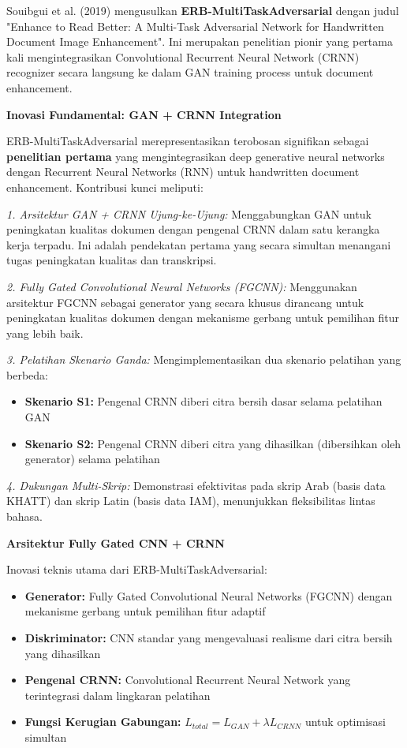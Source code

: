 \documentclass[12pt,a4paper]{article}
\begin{document}
Souibgui et al. (2019) \cite{erb2019} mengusulkan \textbf{ERB-MultiTaskAdversarial} dengan judul "Enhance to Read Better: A Multi-Task Adversarial Network for Handwritten Document Image Enhancement". Ini merupakan penelitian pionir yang pertama kali mengintegrasikan Convolutional Recurrent Neural Network (CRNN) recognizer secara langsung ke dalam GAN training process untuk document enhancement.

\textbf{Inovasi Fundamental: GAN + CRNN Integration}

ERB-MultiTaskAdversarial merepresentasikan terobosan signifikan sebagai \textbf{penelitian pertama} yang mengintegrasikan deep generative neural networks dengan Recurrent Neural Networks (RNN) untuk handwritten document enhancement. Kontribusi kunci meliputi:

\textit{1. Arsitektur GAN + CRNN Ujung-ke-Ujung:} Menggabungkan GAN untuk peningkatan kualitas dokumen dengan pengenal CRNN dalam satu kerangka kerja terpadu. Ini adalah pendekatan pertama yang secara simultan menangani tugas peningkatan kualitas dan transkripsi.

\textit{2. Fully Gated Convolutional Neural Networks (FGCNN):} Menggunakan arsitektur FGCNN sebagai generator yang secara khusus dirancang untuk peningkatan kualitas dokumen dengan mekanisme gerbang untuk pemilihan fitur yang lebih baik.

\textit{3. Pelatihan Skenario Ganda:} Mengimplementasikan dua skenario pelatihan yang berbeda:
\begin{itemize}
    \item \textbf{Skenario S1:} Pengenal CRNN diberi citra bersih dasar selama pelatihan GAN
    \item \textbf{Skenario S2:} Pengenal CRNN diberi citra yang dihasilkan (dibersihkan oleh generator) selama pelatihan
\end{itemize}

\textit{4. Dukungan Multi-Skrip:} Demonstrasi efektivitas pada skrip Arab (basis data KHATT) dan skrip Latin (basis data IAM), menunjukkan fleksibilitas lintas bahasa.

\textbf{Arsitektur Fully Gated CNN + CRNN}

Inovasi teknis utama dari ERB-MultiTaskAdversarial:

\begin{itemize}
    \item \textbf{Generator:} Fully Gated Convolutional Neural Networks (FGCNN) dengan mekanisme gerbang untuk pemilihan fitur adaptif
    \item \textbf{Diskriminator:} CNN standar yang mengevaluasi realisme dari citra bersih yang dihasilkan
    \item \textbf{Pengenal CRNN:} Convolutional Recurrent Neural Network yang terintegrasi dalam lingkaran pelatihan
    \item \textbf{Fungsi Kerugian Gabungan:} $L_{total} = L_{GAN} + \lambda L_{CRNN}$ untuk optimisasi simultan
\end{itemize}
\end{document}
